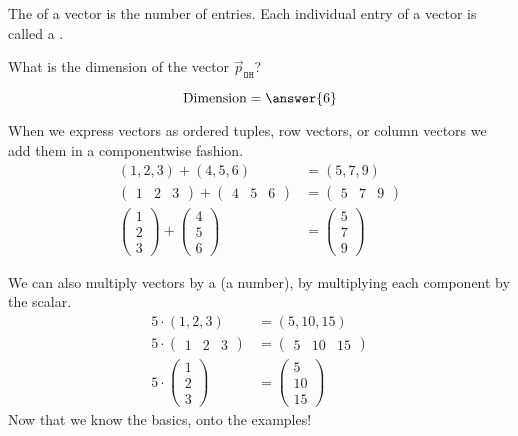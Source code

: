 \documentclass{ximera}
\begin{document}
\begin{definition}
The  of a vector is the number of entries. Each
individual entry of a vector is called a .
\end{definition}

\begin{question}
  What is the dimension of the vector $\vec{p}_{\texttt{OH}}$?
  \begin{prompt}
  \[
  \text{Dimension} = \answer{6}
  \]
  \end{prompt}
\end{question}


When we express vectors as ordered tuples, row vectors, or column
vectors we add them in a componentwise fashion.
\begin{align*}
  (1,2,3) + (4,5,6) &= (5,7,9)\\
  \begin{pmatrix} 1 & 2 & 3   \end{pmatrix} + \begin{pmatrix} 4 & 5 & 6   \end{pmatrix} &= \begin{pmatrix} 5 & 7 & 9   \end{pmatrix}\\
  \begin{pmatrix} 1\\ 2\\ 3   \end{pmatrix} + \begin{pmatrix} 4\\ 5\\ 6   \end{pmatrix} &= \begin{pmatrix} 5\\ 7\\ 9   \end{pmatrix}
\end{align*}

We can also multiply vectors by a  (a number), by
multiplying each component by the scalar.
\begin{align*}
  5\cdot   (1,2,3) &= (5,10,15)\\
  5\cdot \begin{pmatrix} 1 & 2 & 3   \end{pmatrix}  &= \begin{pmatrix} 5 & 10 & 15   \end{pmatrix}\\
  5\cdot  \begin{pmatrix} 1\\ 2\\ 3   \end{pmatrix} &= \begin{pmatrix} 5\\ 10\\ 15   \end{pmatrix}
\end{align*}
Now that we know the basics, onto the examples!
\end{document}
